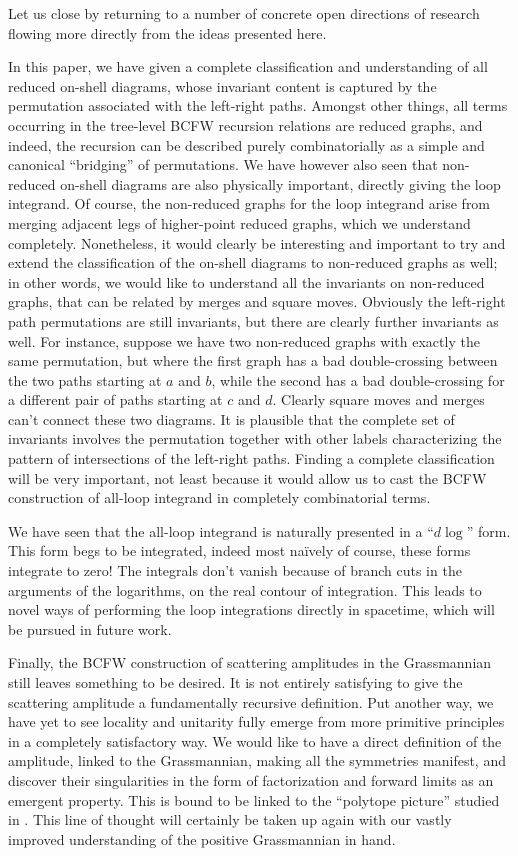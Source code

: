 \documentclass[12pt,hyperref,compress]{JHEP3}
\begin{document}
Let us close by returning to a number of concrete open directions of research flowing more directly from the ideas presented here.

In this paper, we have given a complete classification and understanding of all reduced on-shell diagrams, whose invariant content is captured by the permutation associated with the left-right paths. Amongst other things, all terms occurring
in the tree-level BCFW recursion relations are reduced graphs, and indeed, the recursion can be described purely combinatorially as a simple and canonical ``bridging'' of permutations. We have however also seen that non-reduced on-shell diagrams are also physically important, directly giving the loop integrand. Of course, the non-reduced graphs for the loop integrand arise from merging adjacent legs of higher-point reduced graphs, which we understand completely. Nonetheless, it would clearly be interesting and important to try and extend the classification of the on-shell diagrams to non-reduced graphs as well; in other words, we would like to understand all the invariants on non-reduced graphs, that can be related by merges and square moves. Obviously the left-right path permutations are still invariants, but there are clearly further invariants as well. For instance, suppose we have two non-reduced graphs with exactly the same permutation, but where the first graph has a bad double-crossing between the two paths starting at $a$ and $b$, while the second has a bad double-crossing for a different pair of paths starting at $c$ and $d$. Clearly square moves and merges can't connect these two diagrams. It is plausible that the complete set of invariants involves the permutation together with other labels characterizing the pattern of intersections  of the left-right paths. Finding a complete classification will be very important, not least because it would allow us to cast the BCFW construction of all-loop integrand in completely combinatorial terms.


We have seen that the all-loop integrand is naturally presented in a ``$d\!\log$'' form. This form begs to be integrated, indeed most na\"{i}vely of course, these forms integrate to zero! The integrals don't vanish because of  branch cuts in the arguments of the logarithms, on the real contour of integration. This leads to novel ways of performing the loop integrations directly in spacetime, which will be pursued in future work.

Finally, the BCFW construction of scattering amplitudes in the Grassmannian still leaves something to be desired. It is not entirely satisfying to give the scattering amplitude a fundamentally recursive definition. Put another way, we have yet to see locality and unitarity fully emerge from more primitive principles in a completely satisfactory way. We would like to have a direct definition of the amplitude, linked to the Grassmannian, making all the symmetries manifest, and discover their singularities in the form of factorization and forward limits as an emergent property. This is bound to be linked to the ``polytope picture'' studied in \cite{ArkaniHamed:2010gg,Hodges:2009hk}. This line of thought will certainly be taken up again with our vastly improved understanding of the positive Grassmannian in hand. 
\end{document}

